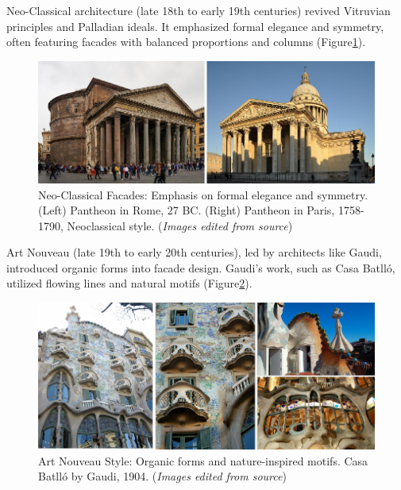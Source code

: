 Neo-Classical architecture (late 18th to early 19th centuries) revived Vitruvian principles and Palladian ideals.
It emphasized formal elegance and symmetry, often featuring facades with balanced proportions and columns (Figure\ref{fig:ClassicismNeoClassicism}).

    \begin{figure}[htb]
    \centering
    \includegraphics[width= \linewidth]{Images/ClassicismNeoClassicism}
    \caption{Neo-Classical Facades: Emphasis on formal elegance and symmetry. (Left) Pantheon in Rome, 27 BC. (Right) Pantheon in Paris, 1758-1790, Neoclassical style. (\textit{Images edited from source})}
    \label{fig:ClassicismNeoClassicism}
    \end{figure}

Art Nouveau (late 19th to early 20th centuries), led by architects like Gaudi, introduced organic forms into facade design.
Gaudi's work, such as Casa Batlló, utilized flowing lines and natural motifs\cite{Nasir2022} (Figure\ref{fig:ArtNouveaustyle}).

    \begin{figure}[htb]
    \centering
    \includegraphics[width= \linewidth]{Images/ArtnouveauGaudi}
    \caption{Art Nouveau Style: Organic forms and nature-inspired motifs. Casa Batlló by Gaudi, 1904. (\textit{Images edited from source})}
    \label{fig:ArtNouveaustyle}
    \end{figure}

